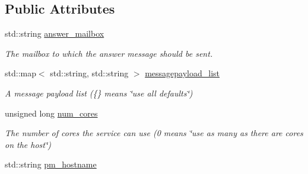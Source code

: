 \subsection*{Public Attributes}
\begin{DoxyCompactItemize}
\item 
\mbox{\label{classwrench_1_1_cloud_service_create_v_m_request_message_affcbf37ecbf136a1ba61d6ea549f8092}} 
std\+::string \hyperlink{classwrench_1_1_cloud_service_create_v_m_request_message_affcbf37ecbf136a1ba61d6ea549f8092}{answer\+\_\+mailbox}
\begin{DoxyCompactList}\small\item\em The mailbox to which the answer message should be sent. \end{DoxyCompactList}\item 
\mbox{\label{classwrench_1_1_cloud_service_create_v_m_request_message_a571588cf2545a317a36452f1c8599e3a}} 
std\+::map$<$ std\+::string, std\+::string $>$ \hyperlink{classwrench_1_1_cloud_service_create_v_m_request_message_a571588cf2545a317a36452f1c8599e3a}{messagepayload\+\_\+list}
\begin{DoxyCompactList}\small\item\em A message payload list (\{\} means \char`\"{}use all defaults\char`\"{}) \end{DoxyCompactList}\item 
\mbox{\label{classwrench_1_1_cloud_service_create_v_m_request_message_a56988853b753fa8fbe8af5dc9b1a328e}} 
unsigned long \hyperlink{classwrench_1_1_cloud_service_create_v_m_request_message_a56988853b753fa8fbe8af5dc9b1a328e}{num\+\_\+cores}
\begin{DoxyCompactList}\small\item\em The number of cores the service can use (0 means \char`\"{}use as many as there are cores on the host\char`\"{}) \end{DoxyCompactList}\item 
\mbox{\label{classwrench_1_1_cloud_service_create_v_m_request_message_a68d03a3acf63eb06fead5ea1f6ed4012}} 
std\+::string \hyperlink{classwrench_1_1_cloud_service_create_v_m_request_message_a68d03a3acf63eb06fead5ea1f6ed4012}{pm\+\_\+hostname}

\end{DoxyCompactItemize}
